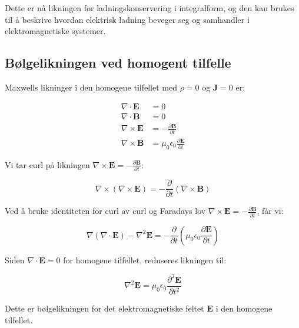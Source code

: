 Dette er nå likningen for ladningskonservering i integralform, og den kan brukes til å beskrive hvordan elektrisk ladning beveger seg og samhandler i elektromagnetiske systemer.

\subsection*{Bølgelikningen ved homogent tilfelle}
Maxwells likninger i den homogene tilfellet med $\rho=0$ og $\mathbf{J}=0$ er:

\begin{align*}
\nabla \cdot \mathbf{E} &= 0 \\
\nabla \cdot \mathbf{B} &= 0 \\      
\nabla \times \mathbf{E} &= -\frac{\partial \mathbf{B}}{\partial t} \\           
\nabla \times \mathbf{B} &= \mu_0\epsilon_0\frac{\partial \mathbf{E}}{\partial t}
\end{align*}

Vi tar curl på likningen $\nabla \times \mathbf{E} = -\frac{\partial \mathbf{B}}{\partial t}$:

\begin{equation*}
\nabla \times (\nabla \times \mathbf{E}) = -\frac{\partial}{\partial t} (\nabla \times \mathbf{B})
\end{equation*}

Ved å bruke identiteten for curl av curl og Faradays lov $\nabla \times \mathbf{E} = -\frac{\partial \mathbf{B}}{\partial t}$, får vi:

\begin{equation*}
\nabla(\nabla \cdot \mathbf{E})-\nabla^2\mathbf{E} = -\frac{\partial}{\partial t}(\mu_0\epsilon_0\frac{\partial \mathbf{E}}{\partial t})
\end{equation*}

Siden $\nabla \cdot \mathbf{E} = 0$ for homogene tilfellet, reduseres likningen til:

\begin{equation*}
\nabla^2\mathbf{E} = \mu_0\epsilon_0\frac{\partial^2 \mathbf{E}}{\partial t^2}
\end{equation*}

Dette er bølgelikningen for det elektromagnetiske feltet $\mathbf{E}$ i den homogene tilfellet.

